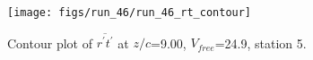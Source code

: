 \begin{figure}[H]
\centering
\texttt{[image: figs/run\_46/run\_46\_rt\_contour]}
\caption{Contour plot of $\overline{r^\prime t^\prime}$ at $z/c$=9.00, $V_{free}$=24.9, station 5.}
\label{fig:run_46_rt_contour}
\end{figure}


